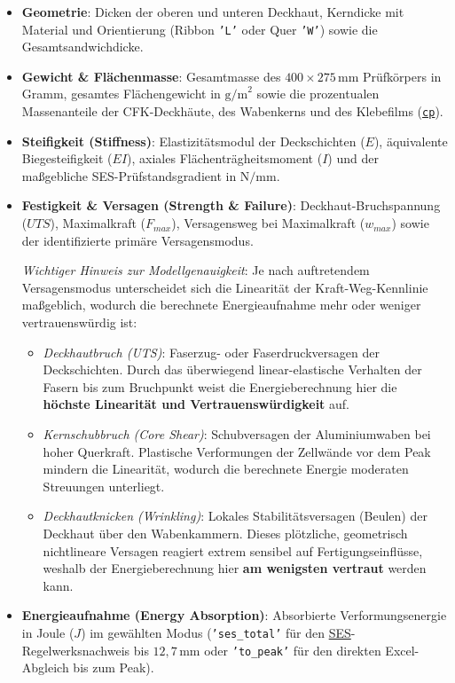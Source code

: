 \begin{itemize}
    \item \textbf{Geometrie}: Dicken der oberen und unteren Deckhaut, Kerndicke mit Material und Orientierung (Ribbon \texttt{'L'} oder Quer \texttt{'W'}) sowie die Gesamtsandwichdicke.
    \item \textbf{Gewicht \& Flächenmasse}: Gesamtmasse des $400 \times 275\,\text{mm}$ Prüfkörpers in Gramm, gesamtes Flächengewicht in $\text{g/m}^2$ sowie die prozentualen Massenanteile der CFK-Deckhäute, des Wabenkerns und des Klebefilms (\hyperref[abk:CP]{\texttt{cp}}).
    \item \textbf{Steifigkeit (Stiffness)}: Elastizitätsmodul der Deckschichten ($E$), äquivalente Biegesteifigkeit (\hyperref[abk:EI]{$EI$}), axiales Flächenträgheitsmoment ($I$) und der maßgebliche SES-Prüfstandsgradient in $\text{N/mm}$.
    \item \textbf{Festigkeit \& Versagen (Strength \& Failure)}: Deckhaut-Bruchspannung (\hyperref[abk:UTS]{$UTS$}), Maximalkraft ($F_{max}$), Versagensweg bei Maximalkraft ($w_{max}$) sowie der identifizierte primäre Versagensmodus. \par
    \textit{Wichtiger Hinweis zur Modellgenauigkeit}: Je nach auftretendem Versagensmodus unterscheidet sich die Linearität der Kraft-Weg-Kennlinie maßgeblich, wodurch die berechnete Energieaufnahme mehr oder weniger vertrauenswürdig ist:
    \begin{itemize}
        \item \textit{Deckhautbruch (UTS)}: Faserzug- oder Faserdruckversagen der Deckschichten. Durch das überwiegend linear-elastische Verhalten der Fasern bis zum Bruchpunkt weist die Energieberechnung hier die \textbf{höchste Linearität und Vertrauenswürdigkeit} auf.
        \item \textit{Kernschubbruch (Core Shear)}: Schubversagen der Aluminiumwaben bei hoher Querkraft. Plastische Verformungen der Zellwände vor dem Peak mindern die Linearität, wodurch die berechnete Energie moderaten Streuungen unterliegt.
        \item \textit{Deckhautknicken (Wrinkling)}: Lokales Stabilitätsversagen (Beulen) der Deckhaut über den Wabenkammern. Dieses plötzliche, geometrisch nichtlineare Versagen reagiert extrem sensibel auf Fertigungseinflüsse, weshalb der Energieberechnung hier \textbf{am wenigsten vertraut} werden kann.
    \end{itemize}
    \item \textbf{Energieaufnahme (Energy Absorption)}: Absorbierte Verformungsenergie in Joule ($J$) im gewählten Modus (\texttt{'ses\_total'} für den \hyperref[abk:SES]{SES}-Regelwerksnachweis bis $12{,}7\,\text{mm}$ oder \texttt{'to\_peak'} für den direkten Excel-Abgleich bis zum Peak).
\end{itemize}

